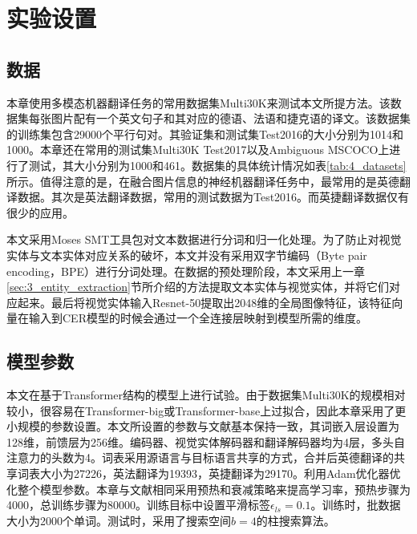 \section{实验设置}
\label{sec:4_setup}

\subsection{数据}
\label{sec:4_dataset}


本章使用多模态机器翻译任务的常用数据集Multi30K\cite{43_elliott-etal-2016-multi30k}来测试本文所提方法。该数据集每张图片配有一个英文句子和其对应的德语、法语和捷克语的译文。该数据集的训练集包含29000个平行句对。其验证集和测试集Test2016的大小分别为1014和1000。本章还在常用的测试集Multi30K Test2017以及Ambiguous MSCOCO上进行了测试，其大小分别为1000和461。数据集的具体统计情况如表\ref{tab:4_datasets}所示。值得注意的是，在融合图片信息的神经机器翻译任务中，最常用的是英德翻译数据。其次是英法翻译数据，常用的测试数据为Test2016。而英捷翻译数据仅有很少的应用。

本文采用Moses SMT\cite{44_koehn-etal-2007-moses}工具包对文本数据进行分词和归一化处理。为了防止对视觉实体与文本实体对应关系的破坏，本文并没有采用双字节编码\cite{27_sennrich-etal-2016-neural}（Byte pair encoding，BPE）进行分词处理。在数据的预处理阶段，本文采用上一章\ref{sec:3_entity_extraction}节所介绍的方法提取文本实体与视觉实体，并将它们对应起来。最后将视觉实体输入Resnet-50\cite{32_DBLP:conf/cvpr/HeZRS16}提取出2048维的全局图像特征，该特征向量在输入到CER模型的时候会通过一个全连接层映射到模型所需的维度。

\subsection{模型参数}
\label{sec:4_model_setup}

本文在基于Transformer\cite{5_DBLP:journals/corr/VaswaniSPUJGKP17}结构的模型上进行试验。由于数据集Multi30K的规模相对较小，很容易在Transformer-big或Transformer-base上过拟合，因此本章采用了更小规模的参数设置。本文所设置的参数与文献\cite{33_yin-etal-2020-novel}基本保持一致，其词嵌入层设置为128维，前馈层为256维。编码器、视觉实体解码器和翻译解码器均为4层，多头自注意力的头数为4。词表采用源语言与目标语言共享的方式，合并后英德翻译的共享词表大小为27226，英法翻译为19393，英捷翻译为29170。利用Adam\cite{34_DBLP:journals/corr/KingmaB14}优化器优化整个模型参数。本章与文献\cite{5_DBLP:journals/corr/VaswaniSPUJGKP17}相同采用预热和衰减策略来提高学习率，预热步骤为4000，总训练步骤为80000。训练目标中设置平滑标签$\epsilon_{ls}=0.1$。训练时，批数据大小为2000个单词。测试时，采用了搜索空间$b=4$的柱搜索算法。

